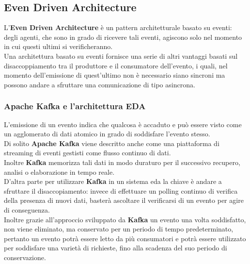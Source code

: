 \subsection{Even Driven Architecture}
L'\textbf{Even Driven Architecture} è un pattern architetturale basato su eventi: degli agenti, che sono in grado di ricevere tali eventi, agiscono solo nel momento in cui questi ultimi si verificheranno. 
\\Una architettura basato su eventi fornisce una serie di altri vantaggi basati sul disaccoppiamento tra il produttore e il consumatore dell'evento, i quali, nel momento dell'emissione di quest'ultimo non è necessario siano sincroni ma possono andare a sfruttare una comunicazione di tipo asincrona. 
\subsubsection{Apache Kafka e l'architettura EDA}
L'emissione di un evento indica che qualcosa è accaduto e può essere visto come un agglomerato di dati atomico in grado di soddisfare l'evento stesso. \\
Di solito \textbf{Apache Kafka} viene descritto anche come una piattaforma di \gls{streaming di eventi}{} gestisti come flusso continuo di dati. \\Inoltre \textbf{Kafka} memorizza tali dati in modo duraturo per il successivo recupero, analisi o elaborazione in tempo reale.
\\D'altra parte per utilizzare \textbf{Kafka} in un sistema \gls{eda}{} la chiave è andare a sfruttare il disaccopiamento: invece di effettuare un polling continuo di verifica della presenza di nuovi dati, basterà ascoltare il verificarsi di un evento per agire di conseguenza. \\Inoltre grazie all'approccio sviluppato da \textbf{Kafka} un evento una volta soddisfatto, non viene eliminato, ma conservato per un periodo di tempo predeterminato, pertanto un evento potrà essere letto da più consumatori e potrà essere utilizzato per soddisfare una varietà di richieste, fino alla scadenza del suo periodo di conservazione. \\
\pagebreak
